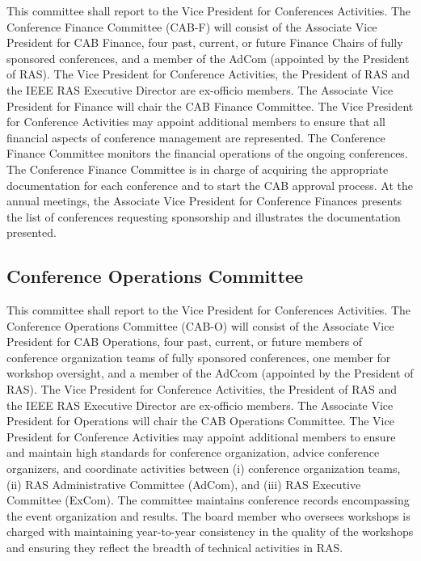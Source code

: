 \documentclass[10pt]{article}
\begin{document}
This committee shall report to the Vice President for Conferences Activities. The Conference Finance Committee (CAB-F) will consist of the Associate Vice President for CAB Finance, four past, current, or future Finance Chairs of fully sponsored conferences, and a member of the AdCom (appointed by the President of RAS).   The Vice President for Conference Activities, the President of RAS and the IEEE RAS Executive Director are ex-officio members. The Associate Vice President for Finance will chair the CAB Finance Committee. The Vice President for Conference Activities may appoint additional members to ensure that all financial aspects of conference management are represented. The Conference Finance Committee monitors the financial operations of the ongoing conferences. The Conference Finance Committee is in charge of acquiring the appropriate documentation for each conference and to start the CAB approval process. At the annual meetings, the Associate Vice President for Conference Finances presents the list of conferences requesting sponsorship and illustrates the documentation presented.

\subsection{Conference Operations Committee}

This committee shall report to the Vice President for Conferences Activities. The Conference Operations Committee (CAB-O) will consist of the Associate Vice President for CAB Operations, four past, current, or future members of conference organization teams of fully sponsored conferences, one member for workshop oversight, and a member of the AdCcom (appointed by the President of RAS).  The Vice President for Conference Activities, the President of RAS and the IEEE RAS Executive Director are ex-officio members. The Associate Vice President for Operations will chair the CAB Operations Committee. The Vice President for Conference Activities may appoint additional members to ensure and maintain high standards for conference organization, advice conference organizers, and coordinate activities between (i) conference organization teams, (ii) RAS Administrative Committee (AdCom), and (iii) RAS Executive Committee (ExCom). The committee maintains conference records encompassing the event organization and results.
The board member who oversees workshops is charged with maintaining year-to-year consistency in the quality of the workshops and ensuring they reflect the breadth of technical activities in RAS.
\end{document}

